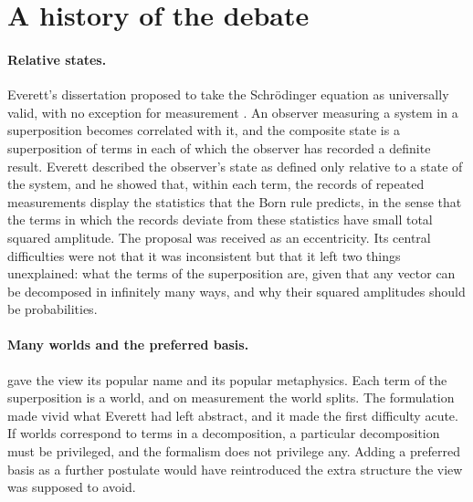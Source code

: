 \documentclass{situationist-preprint}
\begin{document}
\section{A history of the debate}\label{s:history}

\paragraph{Relative states.} Everett's dissertation proposed to take the Schrödinger equation as universally valid, with no exception for measurement \citep{Everett1957}. An observer measuring a system in a superposition becomes correlated with it, and the composite state is a superposition of terms in each of which the observer has recorded a definite result. Everett described the observer's state as defined only relative to a state of the system, and he showed that, within each term, the records of repeated measurements display the statistics that the Born rule predicts, in the sense that the terms in which the records deviate from these statistics have small total squared amplitude. The proposal was received as an eccentricity. Its central difficulties were not that it was inconsistent but that it left two things unexplained: what the terms of the superposition are, given that any vector can be decomposed in infinitely many ways, and why their squared amplitudes should be probabilities.

\paragraph{Many worlds and the preferred basis.} \citet{DeWitt1970} gave the view its popular name and its popular metaphysics. Each term of the superposition is a world, and on measurement the world splits. The formulation made vivid what Everett had left abstract, and it made the first difficulty acute. If worlds correspond to terms in a decomposition, a particular decomposition must be privileged, and the formalism does not privilege any. Adding a preferred basis as a further postulate would have reintroduced the extra structure the view was supposed to avoid.
\end{document}
